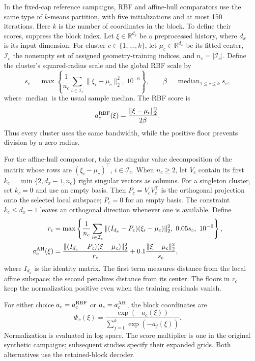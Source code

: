 In the fixed-cap reference campaigns, RBF and affine-hull comparators use
the same type of $k$-means partition, with five initializations and at most 150 iterations. Here $k$ is
the number of coordinates in the block. To define their scores, suppress the
block index. Let $\xi\in\mathbb R^{d_x}$ be a preprocessed history, where
$d_x$ is its input dimension. For cluster $c\in\{1,\ldots,k\}$, let
$\mu_c\in\mathbb R^{d_x}$ be its fitted center, $\mathcal I_c$ the nonempty
set of assigned geometry-training indices, and $n_c=|\mathcal I_c|$.
Define the cluster's squared-radius scale and the global RBF scale by
\[
 s_c=\max\left\{\frac1{n_c}\sum_{i\in\mathcal I_c}
                \|\xi_i-\mu_c\|_2^2,\ 10^{-6}\right\},
 \qquad \beta=\operatorname{median}_{1\leq c\leq k}s_c,
\]
where $\operatorname{median}$ is the usual sample median. The RBF score is
\[
 a_c^{\rm RBF}(\xi)=\frac{\|\xi-\mu_c\|_2^2}{2\beta}.
\]
Thus every cluster uses the same bandwidth, while the positive floor prevents
division by a zero radius.

For the affine-hull comparator, take the singular value decomposition of the
matrix whose rows are $(\xi_i-\mu_c)^\top$, $i\in\mathcal I_c$. When
$n_c\geq2$, let $V_c$ contain its first
$k_c=\min\{2,d_x-1,n_c\}$ right singular vectors as columns. For a singleton
cluster, set $k_c=0$ and use an empty basis. Then $P_c=V_cV_c^\top$ is the
orthogonal projection onto the selected local subspace; $P_c=0$ for an empty
basis. The constraint $k_c\leq d_x-1$ leaves an orthogonal direction whenever
one is available. Define
\begin{align*}
 r_c&=\max\left\{\frac1{n_c}\sum_{i\in\mathcal I_c}
       \|(I_{d_x}-P_c)(\xi_i-\mu_c)\|_2^2,\ 0.05s_c,\ 10^{-6}\right\},\\
 a_c^{\rm AH}(\xi)
 &=\frac{\|(I_{d_x}-P_c)(\xi-\mu_c)\|_2^2}{r_c}
      +0.1\frac{\|\xi-\mu_c\|_2^2}{s_c},
\end{align*}
where $I_{d_x}$ is the identity matrix. The first term measures distance from
the local affine subspace; the second penalizes distance from its center.
The floors in $r_c$ keep the normalization positive even when the training
residuals vanish.

For either choice $a_c=a_c^{\rm RBF}$ or $a_c=a_c^{\rm AH}$, the block
coordinates are
\[
 \Phi_c(\xi)=\frac{\exp(-a_c(\xi))}
                   {\sum_{j=1}^k\exp(-a_j(\xi))}.
\]
Normalization is evaluated in log space. The score multiplier is one in
the original synthetic campaigns; subsequent studies specify their expanded
grids. Both alternatives use the retained-block decoder.

